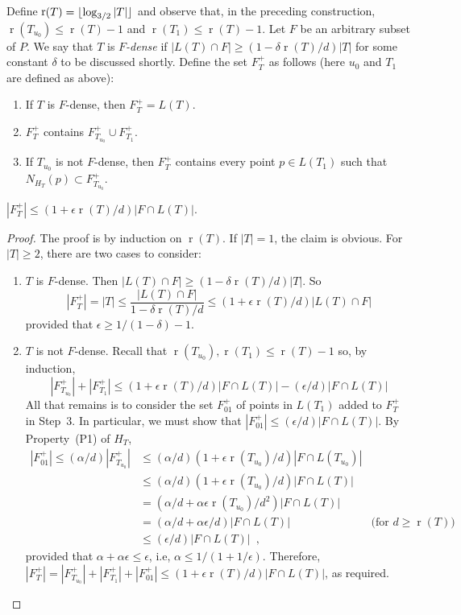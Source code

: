 \documentclass{patmorin}
\DeclareMathOperator{\rank}{r}
\begin{document}
Define $\rank(T)=\floor{\log_{3/2} |T|}$ and observe that, in
the preceding construction, $\rank(T_{u_0}) \le \rank(T)-1$ and
$\rank(T_1)\le\rank(T)-1$.  Let $F$ be an arbitrary subset of $P$.  We say
that $T$ is \emph{$F$-dense} if $|L(T)\cap F|\ge (1-\delta\rank(T)/d)|T|$
for some constant $\delta$ to be discussed shortly.  Define the set
$F^+_T$ as follows (here $u_0$ and $T_1$ are defined as above):

\begin{enumerate}
  \item If $T$ is $F$-dense, then $F^+_T=L(T)$.
  \item $F^+_T$ contains $F^+_{T_{u_0}}\cup F^+_{T_1}$.
  \item If $T_{u_0}$ is not $F$-dense, then $F^+_T$ contains every point $p\in L(T_1)$ such that $N_{H_T}(p)\subset F^+_{T_{u_0}}$.
\end{enumerate}


\begin{clm}
	$|F^+_T| \le (1+\epsilon\rank(T)/d)|F\cap L(T)|$.
\end{clm}

\begin{proof}
  The proof is by induction on $\rank(T)$. If $|T|=1$, the claim is
  obvious. For $|T|\ge 2$, there are two cases to consider:
  \begin{enumerate}
    \item $T$ is $F$-dense. Then  $|L(T)\cap F|\ge
    (1-\delta\rank(T)/d)|T|$.  So
     \[
       |F^+_T|=|T|
	  \le \frac{|L(T)\cap F|}{1-\delta\rank(T)/d} 
          \le (1+\epsilon\rank(T)/d)|L(T)\cap F|
     \]
     provided that $\epsilon \ge 1/(1-\delta)-1$.

    \item $T$ is not $F$-dense. Recall that
    $\rank(T_{u_0}),\rank(T_1)\le\rank(T)-1$ so, by induction,
     \[
        |F^+_{T_{u_0}}|	+ |F^+_{T_{1}}| 
          \le (1+\epsilon\rank(T)/d)|F\cap L(T)| - (\epsilon/d)|F\cap L(T)|
     \]
     All that remains is to consider the set $F^+_{01}$ of points in 
     $L(T_1)$ added to $F^+_T$ in Step~3.  In particular, we must show that
     $|F^+_{01}|\le (\epsilon/d)|F\cap L(T)|$. By Property~(P1) of $H_T$,
     \begin{align*}
      |F^+_{01}| \le (\alpha/d)|F^+_{T_{u_0}}|
        & \le (\alpha/d)(1+\epsilon\rank(T_{u_0})/d)|F\cap L(T_{u_0})| \\
        & \le (\alpha/d)(1+\epsilon\rank(T_{u_0})/d)|F\cap L(T)|\\
        & = (\alpha/d+\alpha\epsilon\rank(T_{u_0})/d^2)|F\cap L(T)| \\
        & = (\alpha/d+\alpha\epsilon/d)|F\cap L(T)| 
	     & \text{(for $d\ge \rank(T)$)} \\
	& \le (\epsilon/d)|F\cap L(T)| \enspace ,
   \end{align*}
   provided that $\alpha+\alpha\epsilon \le \epsilon$, i.e, 
   $\alpha \le 1/(1+1/\epsilon)$. Therefore, 
   $|F^+_T| = |F^+_{T_{u_0}}| + |F^+_{T_1}| + |F^+_{01}| \le (1+\epsilon\rank(T)/d)|F\cap L(T)|$, as required. \qedhere
   \end{enumerate}
\end{proof}
\end{document}
